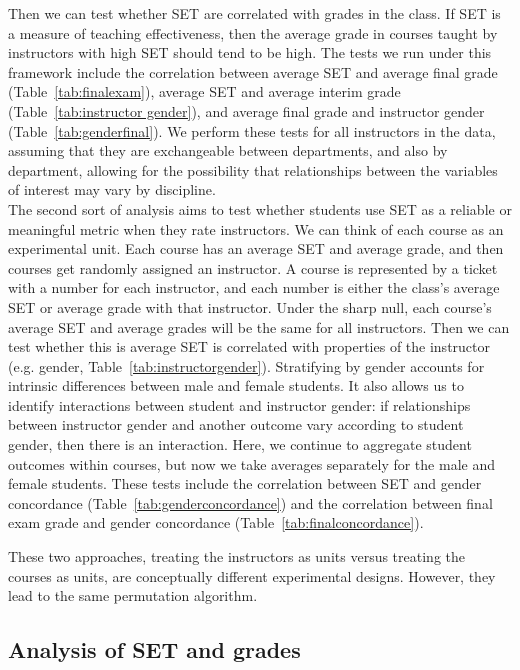 \documentclass[12pt]{article}
\begin{document}
Then we can test whether SET are correlated with grades in the class.  
If SET is a measure of teaching effectiveness, then the average grade in courses taught by 
instructors with high SET should tend to be high.  
The tests we run under this framework include the correlation between average SET and average final grade (Table~\ref{tab:finalexam}), average SET and average interim grade 
(Table~\ref{tab:instructor gender}), and average final grade and instructor gender (Table~\ref{tab:genderfinal}).  We perform these tests for all instructors in the data, assuming that they are exchangeable between departments, and also by department, allowing for the possibility that relationships between the variables of interest may vary by discipline. \\

The second sort of analysis aims to test whether students use SET as a reliable or meaningful metric when they rate instructors.  We can think of each course as an experimental unit.  
Each course has an average SET and average grade, and then courses get randomly assigned an instructor.  
A course is represented by a ticket with a number for each instructor, and each number is either the class's average SET or average grade with that instructor.  
Under the sharp null, each course's average SET and average grades will be the same for all instructors.  
Then we can test whether this is average SET is correlated with properties of the instructor (e.g. gender, Table~\ref{tab:instructorgender}).  
Stratifying by gender accounts for intrinsic differences between male and female students.  
It also allows us to identify interactions between student and instructor gender: if relationships between instructor gender and another outcome vary according to student gender, then there is an interaction.  
Here, we continue to aggregate student outcomes within courses, but now we take averages separately for the male and female students.  
These tests include the correlation between SET and gender concordance (Table~\ref{tab:genderconcordance}) and the correlation between final exam grade and gender concordance (Table~\ref{tab:finalconcordance}).

These two approaches, treating the instructors as units versus treating the courses as units, are conceptually different experimental designs.  However, they lead to the same permutation algorithm.


\subsection{Analysis of SET and grades}
\end{document}
